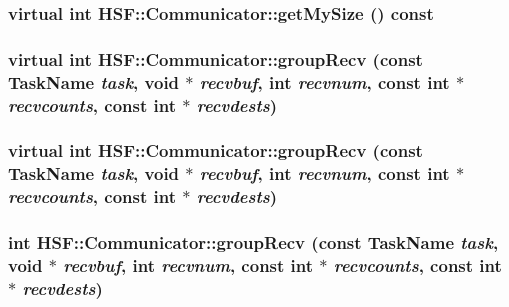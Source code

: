 \hypertarget{classHSF_1_1Communicator_a064ce6664bdb8aaff6ddd1db54bd10ab}{
\subsubsection[{getMySize}]{\setlength{\rightskip}{0pt plus 5cm}virtual int HSF::Communicator::getMySize () const}}
\label{classHSF_1_1Communicator_a064ce6664bdb8aaff6ddd1db54bd10ab}
\hypertarget{classHSF_1_1Communicator_a6735f3712db25e66402f1f6ea95e51ac}{
\subsubsection[{groupRecv}]{\setlength{\rightskip}{0pt plus 5cm}virtual int HSF::Communicator::groupRecv (const {\bf TaskName} {\em task}, \/  void $\ast$ {\em recvbuf}, \/  int {\em recvnum}, \/  const int $\ast$ {\em recvcounts}, \/  const int $\ast$ {\em recvdests})}}
\label{classHSF_1_1Communicator_a6735f3712db25e66402f1f6ea95e51ac}
\hypertarget{classHSF_1_1Communicator_a6735f3712db25e66402f1f6ea95e51ac}{
\subsubsection[{groupRecv}]{\setlength{\rightskip}{0pt plus 5cm}virtual int HSF::Communicator::groupRecv (const {\bf TaskName} {\em task}, \/  void $\ast$ {\em recvbuf}, \/  int {\em recvnum}, \/  const int $\ast$ {\em recvcounts}, \/  const int $\ast$ {\em recvdests})}}
\label{classHSF_1_1Communicator_a6735f3712db25e66402f1f6ea95e51ac}
\hypertarget{classHSF_1_1Communicator_a227d4526e8392d941a5ab1b8ead22ded}{
\subsubsection[{groupRecv}]{\setlength{\rightskip}{0pt plus 5cm}int HSF::Communicator::groupRecv (const {\bf TaskName} {\em task}, \/  void $\ast$ {\em recvbuf}, \/  int {\em recvnum}, \/  const int $\ast$ {\em recvcounts}, \/  const int $\ast$ {\em recvdests})}}
